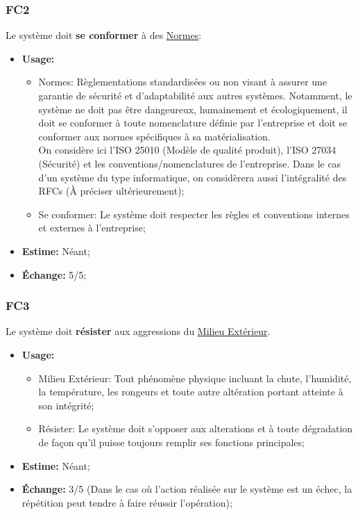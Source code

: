 \documentclass{article}
\begin{document}
\subsubsection{FC2}\label{cat:fc2}
Le système doit \textbf{se conformer} à des \uline{Normes}:
\begin{itemize}
	\item \textbf{Usage:} \begin{itemize}
		\item Normes: Règlementations standardisées ou non visant à assurer une
			  garantie de sécurité et d'adaptabilité aux autres systèmes.
			  Notamment, le système ne doit pas être dangeureux, humainement
			  et écologiquement, il doit se conformer à toute nomenclature
			  définie par l'entreprise et doit se conformer aux normes
			  spécifiques à sa matérialisation.
			  \smallskip\\
			  On considère ici l'ISO 25010 (Modèle de qualité produit), l'ISO
			  27034 (Sécurité) et les conventions/nomenclatures de l'entreprise.
			  Dans le cas d'un système du type informatique, on considèrera
			  aussi l'intégralité des RFCs (À préciser ultérieurement);
		\item Se conformer: Le système doit respecter les règles et conventions
			  internes et externes à l'entreprise;
	\end{itemize}
	\item \textbf{Estime:} Néant;
	\item \textbf{Échange:} 5/5;
\end{itemize}

\subsubsection{FC3}\label{cat:fc3}
Le système doit \textbf{résister} aux aggressions du \uline{Milieu Extérieur}.
\begin{itemize}
	\item \textbf{Usage:} \begin{itemize}
		\item Milieu Extérieur: Tout phénomène physique incluant la chute,
		l'humidité, la température, les rongeurs et toute autre altération
		portant atteinte à son intégrité;
		\item Résister: Le système doit s'opposer aux alterations et à toute
			  dégradation de façon qu'il puisse toujours remplir ses fonctions
			  principales;
	\end{itemize}
	\item \textbf{Estime:} Néant;
	\item \textbf{Échange:} 3/5 (Dans le cas où l'action réalisée sur le
		  système est un échec, la répétition peut tendre à faire réussir
		  l'opération);
\end{itemize}
\end{document}
